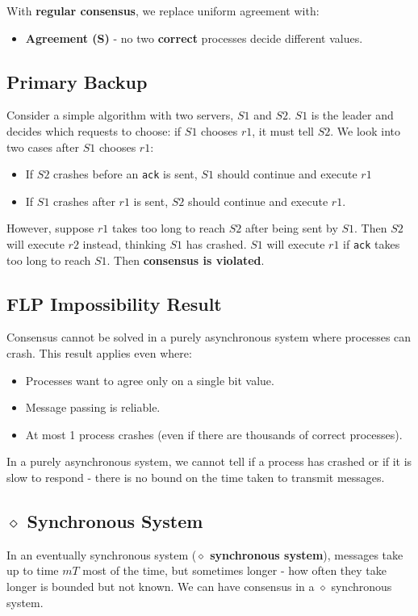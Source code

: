 \documentclass[11pt]{article}
\begin{document}
With \textbf{regular consensus}, we replace uniform agreement with:
\begin{itemize}
  \item \textbf{Agreement (S)} - no two \textbf{correct} processes decide different values.
\end{itemize}

\subsection{Primary Backup}
Consider a simple algorithm with two servers, $S1$ and $S2$.
$S1$ is the leader and decides which requests to choose: if $S1$ chooses $r1$, it must tell $S2$.
We look into two cases after $S1$ chooses $r1$:
\begin{itemize}
  \item If $S2$ crashes before an \texttt{ack} is sent, $S1$ should continue and execute $r1$
  \item If $S1$ crashes after $r1$ is sent, $S2$ should continue and execute $r1$.
\end{itemize}
However, suppose $r1$ takes too long to reach $S2$ after being sent by $S1$.
Then $S2$ will execute $r2$ instead, thinking $S1$ has crashed.
$S1$ will execute $r1$ if \texttt{ack} takes too long to reach $S1$.
Then \textbf{consensus is violated}.

\subsection{FLP Impossibility Result}
Consensus cannot be solved in a purely asynchronous system where processes can crash.
This result applies even where:
\begin{itemize}
  \item Processes want to agree only on a single bit value.
  \item Message passing is reliable.
  \item At most 1 process crashes (even if there are thousands of correct processes).
\end{itemize}
In a purely asynchronous system, we cannot tell if a process has crashed or if it is slow to respond - there is no bound on the time taken to transmit messages.

\subsection{$\diamond$ Synchronous System}
In an eventually synchronous system (\textbf{$\diamond$ synchronous system}), messages take up to time $mT$ most of the time, but sometimes longer - how often they take longer is bounded but not known.
We can have consensus in a $\diamond$ synchronous system.
\end{document}
